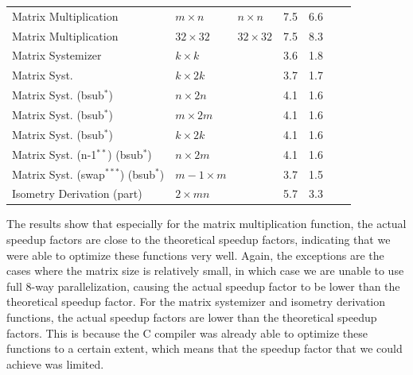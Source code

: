 \documentclass[11pt,a4paper]{report}
\theoremstyle{definition}
\begin{document}
\begin{table}[H]
{\begin{tabular}{lllrrrr}
      Matrix Multiplication                    & $m \times n$                            & $n \times n$                   & 7.5                & 6.6                \\
      Matrix Multiplication                    & $32 \times 32$                          & $32 \times 32$                 & 7.5                & 8.3                \\
      \midrule
      Matrix Systemizer                        & $k \times k$                            &                                & 3.6                & 1.8                \\
      Matrix Syst.                             & $k \times 2k$                           &                                & 3.7                & 1.7                \\
      Matrix Syst. (bsub$^{*}$)                & $n \times 2n$                           &                                & 4.1                & 1.6                \\
      Matrix Syst. (bsub$^{*}$)                & $m \times 2m$                           &                                & 4.1                & 1.6                \\
      Matrix Syst. (bsub$^{*}$)                & $k \times 2k$                           &                                & 4.1                & 1.6                \\
      Matrix Syst. (n-1$^{**}$) (bsub$^{*}$)   & $n \times 2m$                           &                                & 4.1                & 1.6                \\
      Matrix Syst. (swap$^{***}$) (bsub$^{*}$) & $m-1 \times m$                          &                                & 3.7                & 1.5                \\
      \midrule
      Isometry Derivation (part)               & $2 \times mn$                           &                                & 5.7                & 3.3                \\
      \bottomrule
    \end{tabular}
  }
  \label{tab:lowleveloptimizationresults2}
\end{table}

The results show that especially for the matrix multiplication function, the actual speedup factors are close to the theoretical speedup factors, indicating that we were able to optimize these functions very well. Again, the exceptions are the cases where the matrix size is relatively small, in which case we are unable to use full 8-way parallelization, causing the actual speedup factor to be lower than the theoretical speedup factor. For the matrix systemizer and isometry derivation functions, the actual speedup factors are lower than the theoretical speedup factors. This is because the C compiler was already able to optimize these functions to a certain extent, which means that the speedup factor that we could achieve was limited.
\end{document}
